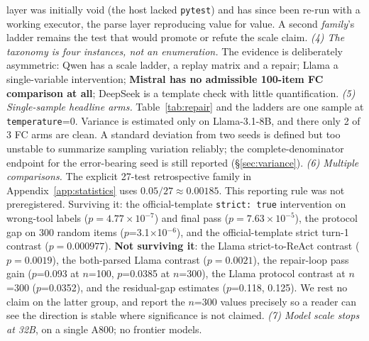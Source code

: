 layer was initially void (the host lacked \texttt{pytest}) and has since been re-run with a
working executor, the parse layer reproducing value for value. A second \emph{family}'s ladder
remains the test that would promote or refute the scale claim.
\emph{(4) The taxonomy is four instances, not an enumeration.} The evidence is deliberately
asymmetric: Qwen has a scale ladder, a replay matrix and a repair; Llama a single-variable
intervention; \textbf{Mistral has no admissible 100-item FC comparison at all}; DeepSeek is a
template check with little quantification.
\emph{(5) Single-sample headline arms.} Table~\ref{tab:repair} and the ladders are one sample at
\texttt{temperature}=0. Variance is estimated only on Llama-3.1-8B, and there only 2 of 3 FC arms
are clean. A standard deviation from two seeds is defined but too unstable to summarize sampling
variation reliably; the complete-denominator endpoint for the error-bearing seed is still
reported (\S\ref{sec:variance}).
\emph{(6) Multiple comparisons.} The explicit 27-test retrospective family in Appendix~\ref{app:statistics} uses
$0.05/27\approx0.00185$. This reporting rule was not preregistered. Surviving it: the official-template \texttt{strict: true}
intervention on wrong-tool labels ($p=4.77\times10^{-7}$) and final pass
($p=7.63\times10^{-5}$), the protocol gap on 300 random items ($p$=3.1$\times$10$^{-6}$), and the official-template strict turn-1 contrast ($p=0.000977$). \textbf{Not surviving it}: the Llama strict-to-ReAct contrast ($p=0.0019$),
the both-parsed Llama contrast ($p=0.0021$), the repair-loop pass gain ($p$=0.093 at
$n$=100, $p$=0.0385 at $n$=300), the Llama protocol contrast at $n$=300 ($p$=0.0352), and the
residual-gap estimates ($p$=0.118, 0.125). We rest no claim on the latter group, and report the
$n$=300 values precisely so a reader can see the direction is stable where significance is not
claimed.
\emph{(7) Model scale stops at 32B}, on a single A800; no frontier models.

